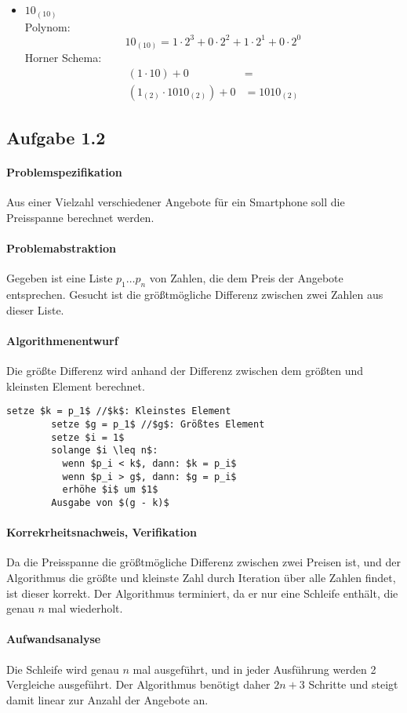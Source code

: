 \documentclass{article}
\begin{document}
\begin{itemize}
\begin{equation}
          \end{equation}
        \item $10_{(10)}$\\
        Polynom:
        \begin{equation}
          10_{(10)} = 1 \cdot 2^3 + 0 \cdot 2^2 + 1 \cdot 2^1 + 0 \cdot 2^0
        \end{equation}
        Horner Schema:
          \begin{equation}
            \begin{aligned}
              (1 \cdot 10) + 0 &=\\
              (1_{(2)} \cdot 1010_{(2)}) + 0 &= 1010_{(2)}
            \end{aligned}
          \end{equation}
      \end{itemize}
    \subsection{Aufgabe 1.2}
      \paragraph{Problemspezifikation} Aus einer Vielzahl verschiedener Angebote
        für ein Smartphone soll die Preisspanne berechnet werden.
      \paragraph{Problemabstraktion} Gegeben ist eine Liste $p_1 \ldots p_n$ von
        Zahlen, die dem Preis der Angebote entsprechen. Gesucht ist die
        größtmögliche Differenz zwischen zwei Zahlen aus dieser Liste.
      \paragraph{Algorithmenentwurf} Die größte Differenz wird anhand der
      Differenz zwischen dem größten und kleinsten Element berechnet.\\
      \begin{lstlisting}[mathescape=true]
        setze $k = p_1$ //$k$: Kleinstes Element
        setze $g = p_1$ //$g$: Größtes Element
        setze $i = 1$
        solange $i \leq n$:
          wenn $p_i < k$, dann: $k = p_i$
          wenn $p_i > g$, dann: $g = p_i$
          erhöhe $i$ um $1$
        Ausgabe von $(g - k)$
      \end{lstlisting}
      \paragraph{Korrekrheitsnachweis, Verifikation} Da die Preisspanne die
        größtmögliche Differenz zwischen zwei Preisen ist, und der Algorithmus
        die größte und kleinste Zahl durch Iteration über alle Zahlen findet,
        ist dieser korrekt. Der Algorithmus terminiert, da er nur eine Schleife
        enthält, die genau $n$ mal wiederholt.
      \paragraph{Aufwandsanalyse} Die Schleife wird genau $n$ mal ausgeführt,
      und in jeder Ausführung werden 2 Vergleiche ausgeführt. Der Algorithmus
      benötigt daher $2n+3$ Schritte und steigt damit linear zur Anzahl der
      Angebote an.
\end{document}
